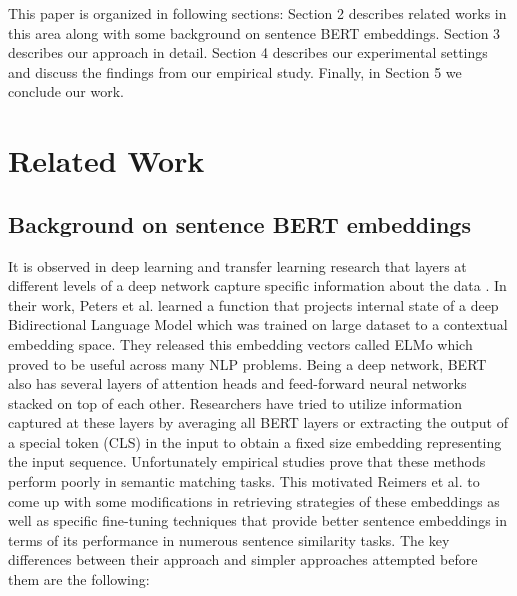 \documentclass[sigconf,authordraft]{acmart}
\begin{document}
This paper is organized in following sections: Section 2 describes related works in this area along with some background on sentence BERT embeddings. Section 3 describes our approach in detail. Section 4 describes our experimental settings and discuss the findings from our empirical study. Finally, in Section 5 we conclude our work.


\section{Related Work}
\subsection{Background on sentence BERT embeddings}
It is observed in deep learning and transfer learning research that layers at different levels of a deep network capture specific information about the data \cite{peters2018dissecting}. In their work, Peters et al. \cite{peters2018deep} learned a function that projects internal state of a deep Bidirectional Language Model which was trained on large dataset to a contextual embedding space. They released this embedding vectors called ELMo which proved to be useful across many NLP problems. Being a deep network, BERT \cite{devlin2018bert} also has several layers of attention heads and feed-forward neural networks stacked on top of each other. Researchers have tried to utilize information captured at these layers by averaging all BERT layers \cite{zhang2019bertscore} or extracting the output of a special token (CLS) in the input \cite{may2019measuring}\cite{qiao2019understanding} to obtain a fixed size embedding representing the input sequence. Unfortunately empirical studies prove that these methods perform poorly in semantic matching tasks. This motivated Reimers et al. \cite{reimers2019sentence} to come up with some modifications in retrieving strategies of these embeddings as well as specific fine-tuning techniques that provide better sentence embeddings in terms of its performance in numerous sentence similarity tasks. The key differences between their approach and simpler approaches attempted before them are the following:
\end{document}

